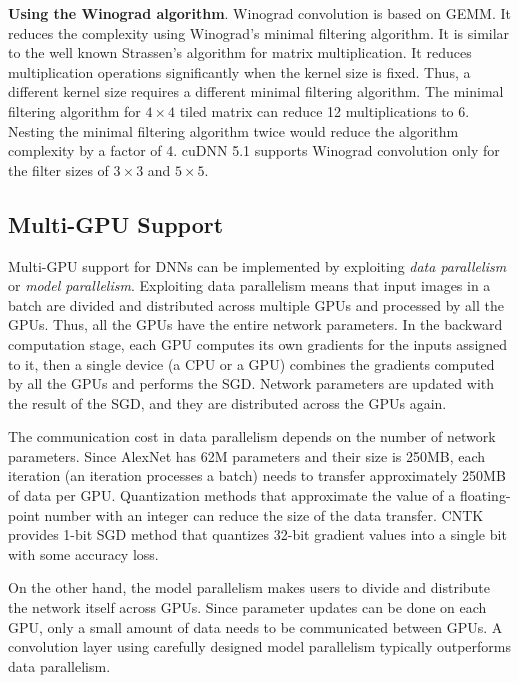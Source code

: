 {\bf Using the Winograd algorithm}.
Winograd convolution is based on GEMM\cite{cublas}.
It reduces the complexity using Winograd's minimal filtering algorithm\cite{winograd}.
It is similar to the well known Strassen's algorithm\cite{winograd1980arithmetic} for matrix multiplication.
It reduces multiplication operations significantly when the kernel size is fixed.
Thus, a different kernel size requires a different minimal filtering algorithm.
The minimal filtering algorithm for $4 \times 4$ tiled matrix can reduce 12 multiplications to 6.
Nesting the minimal filtering algorithm twice would reduce the algorithm complexity by a factor of 4\cite{winograd}.
cuDNN 5.1 supports Winograd convolution only for the filter sizes of $3 \times 3$ and $5 \times 5$.

\subsection{Multi-GPU Support}
\label{sec:multiGPU-parallelism}
Multi-GPU support for DNNs can be implemented by exploiting \textit{data parallelism} or \textit{model parallelism}\cite{NIPS2012_4687}. Exploiting data parallelism means that input images in a batch are divided and distributed across multiple GPUs and processed by all the GPUs. Thus, all the GPUs have the entire network parameters. In the backward computation stage, each GPU computes its own gradients for the inputs assigned to it, then a single device (a CPU or a GPU) combines the gradients computed by all the GPUs and performs the SGD. Network parameters are updated with the result of the SGD, and they are distributed across the GPUs again. 

The communication cost in data parallelism depends on the number of network parameters. Since AlexNet has 62M parameters and their size is 250MB, each iteration (an iteration processes a batch) needs to transfer approximately 250MB of data per GPU. Quantization methods that approximate the value of a floating-point number with an integer can reduce the size of the data transfer\cite{deepcompress}. CNTK provides 1-bit SGD method that quantizes 32-bit gradient values into a single bit with some accuracy loss\cite{1-bit-stochastic-gradient-descent-and-application-to-data-parallel-distributed-training-of-speech-dnns}.

On the other hand, the model parallelism makes users to divide and distribute the network itself across GPUs. Since parameter updates can be done on each GPU, only a small amount of data needs to be communicated between GPUs. A convolution layer using carefully designed model parallelism typically outperforms data parallelism\cite{DBLP:journals/corr/YadanATR13}.

